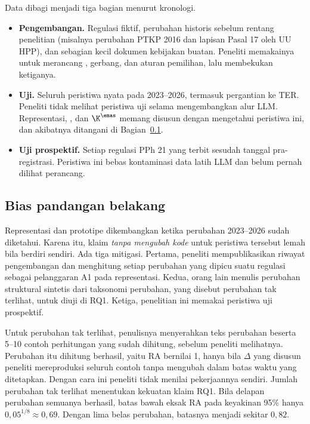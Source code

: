 Data dibagi menjadi tiga bagian menurut kronologi.
\begin{itemize}[leftmargin=*,nosep]
  \item \textbf{Pengembangan.} Regulasi fiktif, perubahan historis sebelum rentang penelitian (misalnya perubahan PTKP 2016 dan lapisan Pasal 17 oleh UU HPP), dan sebagian kecil dokumen kebijakan buatan. Peneliti memakainya untuk merancang , gerbang, dan aturan pemilihan, lalu membekukan ketiganya.
  \item \textbf{Uji.} Seluruh peristiwa nyata pada 2023--2026, termasuk pergantian ke TER. Peneliti tidak melihat peristiwa uji selama mengembangkan alur LLM. Representasi, , dan $\K^{\emas}$ memang disusun dengan mengetahui peristiwa ini, dan akibatnya ditangani di Bagian~\ref{subsec:hindsight}.
  \item \textbf{Uji prospektif.} Setiap regulasi PPh 21 yang terbit sesudah tanggal pra-registrasi. Peristiwa ini bebas kontaminasi data latih LLM dan belum pernah dilihat perancang.
\end{itemize}

\subsection{Bias pandangan belakang}
\label{subsec:hindsight}

Representasi dan  prototipe dikembangkan ketika perubahan 2023--2026 sudah diketahui. Karena itu, klaim \emph{tanpa mengubah kode} untuk peristiwa tersebut lemah bila berdiri sendiri. Ada tiga mitigasi. Pertama, peneliti mempublikasikan riwayat pengembangan  dan menghitung setiap perubahan  yang dipicu suatu regulasi sebagai pelanggaran A1 pada representasi. Kedua, orang lain menulis perubahan struktural sintetis dari taksonomi perubahan, yang disebut perubahan tak terlihat, untuk diuji di RQ1. Ketiga, penelitian ini memakai peristiwa uji prospektif.

Untuk perubahan tak terlihat, penulisnya menyerahkan teks perubahan beserta 5--10 contoh perhitungan yang sudah dihitung, sebelum peneliti melihatnya. Perubahan itu dihitung berhasil, yaitu RA bernilai 1, hanya bila $\Delta$ yang disusun peneliti mereproduksi seluruh contoh tanpa mengubah  dalam batas waktu yang ditetapkan. Dengan cara ini peneliti tidak menilai pekerjaannya sendiri. Jumlah perubahan tak terlihat menentukan kekuatan klaim RQ1. Bila delapan perubahan semuanya berhasil, batas bawah eksak RA pada keyakinan 95\% hanya $0{,}05^{1/8} \approx 0{,}69$. Dengan lima belas perubahan, batasnya menjadi sekitar $0{,}82$.


